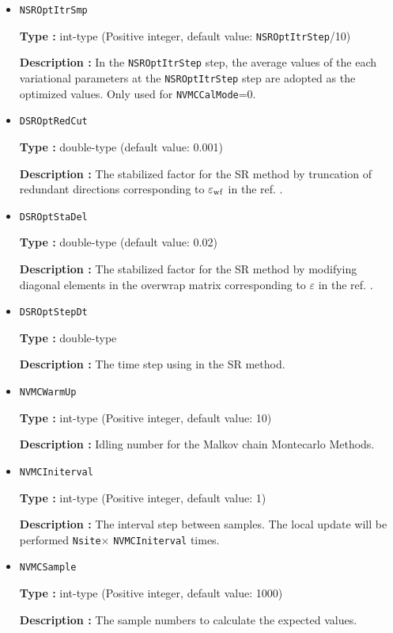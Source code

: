 \begin{itemize}
 \item  \verb|NSROptItrSmp|

{\bf Type :} int-type (Positive integer, default value: \verb|NSROptItrStep|/10)

{\bf Description :} In the \verb|NSROptItrStep| step, the average values of the each variational parameters at the \verb|NSROptItrStep| step are adopted as the optimized values. Only used for \verb|NVMCCalMode|=0.

\item   \verb|DSROptRedCut|
   
{\bf Type :} double-type (default value: 0.001)

{\bf Description :} The stabilized factor for the SR method by truncation of redundant directions corresponding to $\varepsilon_{\rm wf}$ in the ref. \cite{Tahara2008}.

 \item  \verb|DSROptStaDel| 
   
 {\bf Type :} double-type (default value: 0.02)

  {\bf Description :} The stabilized factor for the SR method by modifying diagonal elements in the overwrap matrix corresponding to $\varepsilon$ in the ref. \cite{Tahara2008}.
     
\item \verb|DSROptStepDt|

{\bf Type :} double-type 

{\bf Description :} The time step using in the SR method. 
 
\item \verb|NVMCWarmUp|

{\bf Type :} int-type (Positive integer, default value: 10)

{\bf Description :} Idling number for the Malkov chain Montecarlo Methods.

\item \verb|NVMCIniterval|

{\bf Type :} int-type (Positive integer, default value: 1)

{\bf Description :} The interval step between samples. The local update will be performed \verb|Nsite|× \verb|NVMCIniterval| times.

\item \verb|NVMCSample|

{\bf Type :} int-type (Positive integer, default value: 1000)

{\bf Description :} The sample numbers to calculate the expected values.


\end{itemize}
